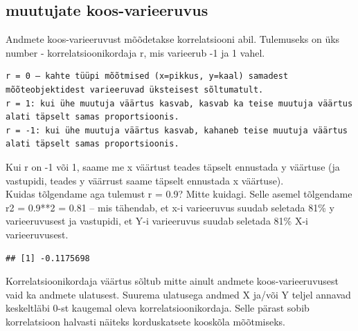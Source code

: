 \documentclass[]{book}
\newenvironment{Shaded}{\begin{snugshade}}{\end{snugshade}}
\newcommand{\KeywordTok}[1]{\textcolor[rgb]{0.13,0.29,0.53}{\textbf{#1}}}
\newcommand{\DataTypeTok}[1]{\textcolor[rgb]{0.13,0.29,0.53}{#1}}
\newcommand{\StringTok}[1]{\textcolor[rgb]{0.31,0.60,0.02}{#1}}
\newcommand{\CommentTok}[1]{\textcolor[rgb]{0.56,0.35,0.01}{\textit{#1}}}
\newcommand{\OperatorTok}[1]{\textcolor[rgb]{0.81,0.36,0.00}{\textbf{#1}}}
\newcommand{\NormalTok}[1]{#1}
\begin{document}
\subsection{muutujate
koos-varieeruvus}\label{muutujate-koos-varieeruvus}

Andmete koos-varieeruvust mõõdetakse korrelatsiooni abil. Tulemuseks on
üks number - korrelatsioonikordaja r, mis varieerub -1 ja 1 vahel.

\begin{verbatim}
r = 0 – kahte tüüpi mõõtmised (x=pikkus, y=kaal) samadest mõõteobjektidest varieeruvad üksteisest sõltumatult. 
r = 1: kui ühe muutuja väärtus kasvab, kasvab ka teise muutuja väärtus alati täpselt samas proportsioonis. 
r = -1: kui ühe muutuja väärtus kasvab, kahaneb teise muutuja väärtus alati täpselt samas proportsioonis. 
\end{verbatim}

Kui r on -1 või 1, saame me x väärtust teades täpselt ennustada y
väärtuse (ja vastupidi, teades y väärrust saame täpselt ennustada x
väärtuse).\\
Kuidas tõlgendame aga tulemust r = 0.9? Mitte kuidagi. Selle asemel
tõlgendame r2 = 0.9**2 = 0.81 -- mis tähendab, et x-i varieeruvus suudab
seletada 81\% y varieeruvusest ja vastupidi, et Y-i varieeruvus suudab
seletada 81\% X-i varieeruvusest.

\begin{Shaded}
\end{Shaded}

\begin{verbatim}
## [1] -0.1175698
\end{verbatim}

Korrelatsioonikordaja väärtus sõltub mitte ainult andmete
koos-varieeruvusest vaid ka andmete ulatusest. Suurema ulatusega andmed
X ja/või Y teljel annavad keskeltläbi 0-st kaugemal oleva
korrelatsioonikordaja. Selle pärast sobib korrelatsioon halvasti näiteks
korduskatsete kooskõla mõõtmiseks.
\end{document}
